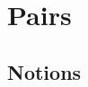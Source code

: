 \documentclass{book}
\begin{document}
% 			
% 			
% 		
% 		
% 		
	\chapter{Pairs}
		\section{Notions}
		
\end{document}
